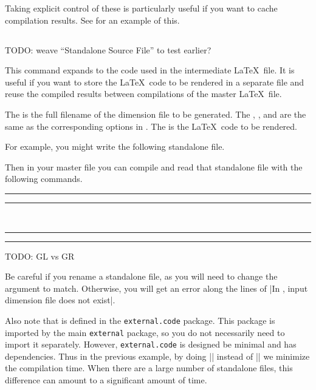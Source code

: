 \documentclass[10pt]{ltxdoc}
\newcommand{\pkg}[1]{\texttt{#1}}
\newcommand{\showfile}[1]{
  \begin{tcolorbox}[title=\texttt{#1}]
  
  \end{tcolorbox}
}
\def\sz{%
  \rule{0.2em}{7pt}%
  \llap{\rule[8pt]{0.2em}{2pt}}%
}
\begin{document}
Taking explicit control of these is particularly useful if you want to
cache compilation results.
See  for an example of this.

\subsection{}
\label{subsec:ExternalCode}


TODO: weave ``Standalone Source File'' to test earlier?

This command expands to the code used in the intermediate \LaTeX\ file.
It is useful if you want to store the \LaTeX\ code to be rendered in a
separate file and reuse the compiled results between compilations
of the master \LaTeX\ file.

The  is the full filename of the dimension file to
be generated.
The , , and  are the
same as the corresponding options in .
The  is the \LaTeX\ code to be rendered.

For example, you might write the following standalone file.

\showfile{example-standalone-simple.tex}

Then in your master file you can compile and read that standalone file
with the following commands.

\begin{tcblisting}{}
\sz\ExternalCompile[file=example-standalone-simple]\sz~%
\sz\ExternalRead[file=example-standalone-simple]\sz
\end{tcblisting}

TODO: GL vs GR

Be careful if you rename a standalone file, as you will need to change
the  argument to match.
Otherwise, you will get an error along the lines of
|In \ExternalRead, input dimension file does not exist|.

Also note that  is defined in the \pkg{external.code}
package.
This package is imported by the main \pkg{external} package, so you do
not necessarily need to import it separately.
However, \pkg{external.code} is designed be minimal and has
dependencies.
Thus in the previous example, by doing |\RequirePackage{external.code}|
instead of |\RequirePackage{external}| we minimize the compilation
time.
When there are a large number of standalone files, this difference can
amount to a significant amount of time.
\end{document}
